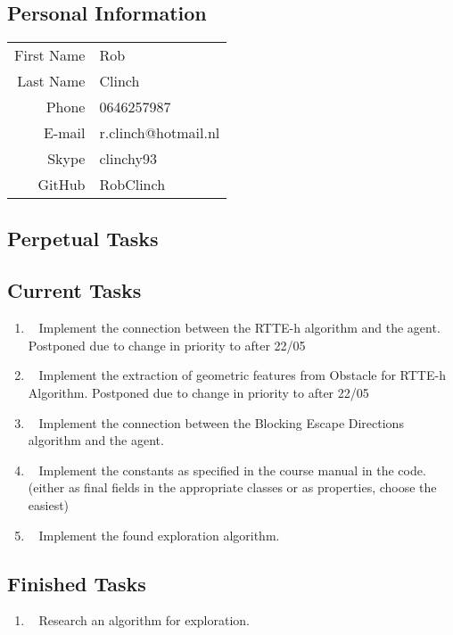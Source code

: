 \subsection{Personal Information}
\begin{table}[h!]
	\begin{tabular}{rl}
		First Name 	& Rob\\
		Last Name	& Clinch\\
		Phone		& 0646257987\\
		E-mail		& r.clinch@hotmail.nl\\
		Skype		& clinchy93\\
		GitHub		& RobClinch
	\end{tabular}
\end{table}

\subsection{Perpetual Tasks}

\subsection{Current Tasks}
\begin{enumerate}
	\item~
	Implement the connection between the RTTE-h algorithm and the agent.
		\subitem Postponed due to change in priority to after 22/05
	\item~
	Implement the extraction of geometric features from Obstacle for RTTE-h Algorithm.
		\subitem Postponed due to change in priority to after 22/05
	\item~
		Implement the connection between the Blocking Escape Directions algorithm and the agent.
	\item~
		Implement the constants as specified in the course manual in the code. (either as final fields in the appropriate classes or as properties, choose the easiest)
	\item~
		Implement the found exploration algorithm.
\end{enumerate}

\subsection{Finished Tasks}
\begin{enumerate}
\item~
		Research an algorithm for exploration.
\end{enumerate}
